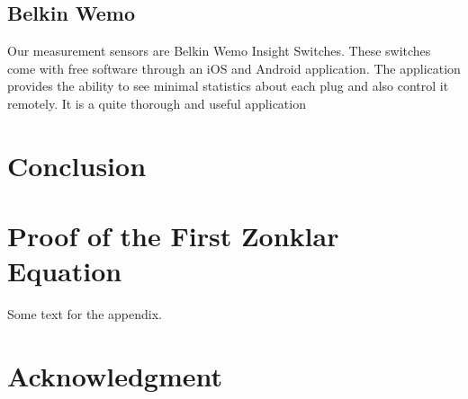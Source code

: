 \documentclass[journal]{IEEEtran}
\begin{document}
\subsection{Belkin Wemo}
Our measurement sensors are Belkin Wemo Insight Switches. These switches come with free software through an iOS and Android application. The application provides the ability to see minimal statistics about each plug and also control it remotely. It is a quite thorough and useful application

\section{Conclusion}
\blindtext






%


\appendices
\section{Proof of the First Zonklar Equation}
Some text for the appendix.

\section*{Acknowledgment}
\end{document}
